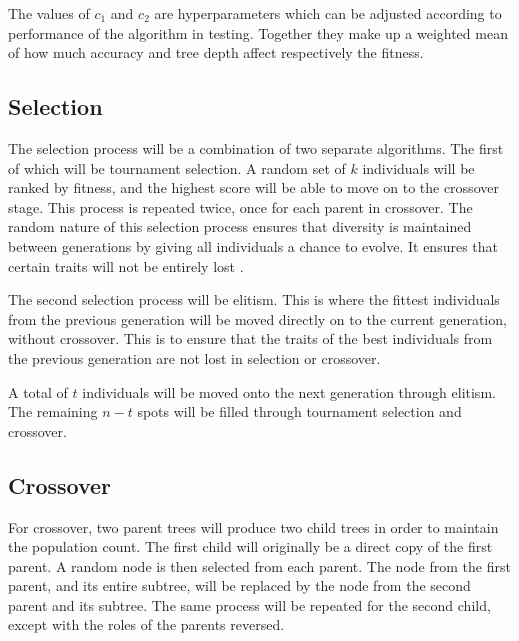 \documentclass[12pt]{article}
\begin{document}
The values of $c_1$ and $c_2$ are hyperparameters which can be adjusted according to performance of the algorithm in testing. Together they make up a weighted mean of how much accuracy and tree depth affect respectively the fitness.

\subsection{Selection}

The selection process will be a combination of two separate algorithms. The first of which will be tournament selection. A random set of $k$ individuals will be ranked by fitness, and the highest score will be able to move on to the crossover stage. This process is repeated twice, once for each parent in crossover. The random nature of this selection process ensures that diversity is maintained between generations by giving all individuals a chance to evolve. It ensures that certain traits will not be entirely lost \cite{blickle_1997}.

The second selection process will be elitism. This is where the fittest individuals from the previous generation will be moved directly on to the current generation, without crossover. This is to ensure that the traits of the best individuals from the previous generation are not lost in selection or crossover.

A total of $t$ individuals will be moved onto the next generation through elitism. The remaining $n - t$ spots will be filled through tournament selection and crossover.

\subsection{Crossover}

For crossover, two parent trees will produce two child trees in order to maintain the population count. The first child will originally be a direct copy of the first parent. A random node is then selected from each parent. The node from the first parent, and its entire subtree, will be replaced by the node from the second parent and its subtree. The same process will be repeated for the second child, except with the roles of the parents reversed.
\end{document}
